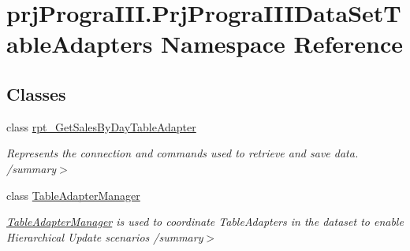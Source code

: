 \hypertarget{namespaceprj_progra_i_i_i_1_1_prj_progra_i_i_i_data_set_table_adapters}{}\section{prj\+Progra\+I\+I\+I.\+Prj\+Progra\+I\+I\+I\+Data\+Set\+Table\+Adapters Namespace Reference}
\label{namespaceprj_progra_i_i_i_1_1_prj_progra_i_i_i_data_set_table_adapters}
\subsection*{Classes}
\begin{DoxyCompactItemize}
\item 
class \hyperlink{classprj_progra_i_i_i_1_1_prj_progra_i_i_i_data_set_table_adapters_1_1rpt___get_sales_by_day_table_adapter}{rpt\+\_\+\+Get\+Sales\+By\+Day\+Table\+Adapter}
\begin{DoxyCompactList}\small\item\em Represents the connection and commands used to retrieve and save data. /summary$>$ \end{DoxyCompactList}\item 
class \hyperlink{classprj_progra_i_i_i_1_1_prj_progra_i_i_i_data_set_table_adapters_1_1_table_adapter_manager}{Table\+Adapter\+Manager}
\begin{DoxyCompactList}\small\item\em \hyperlink{classprj_progra_i_i_i_1_1_prj_progra_i_i_i_data_set_table_adapters_1_1_table_adapter_manager}{Table\+Adapter\+Manager} is used to coordinate Table\+Adapters in the dataset to enable Hierarchical Update scenarios /summary$>$ \end{DoxyCompactList}\end{DoxyCompactItemize}
